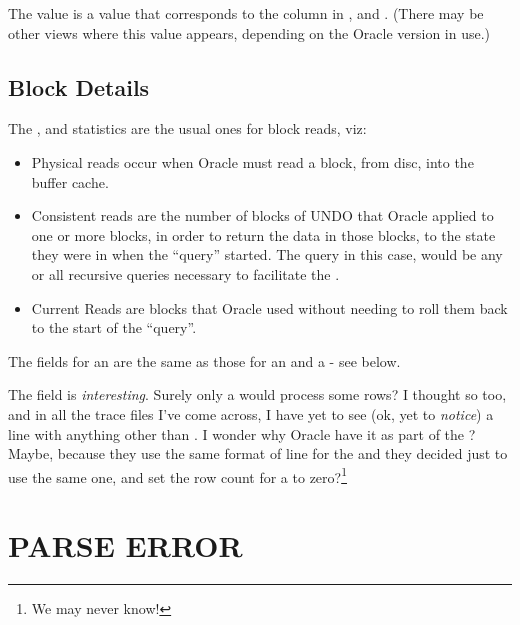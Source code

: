 The  value is a value that corresponds to the column  in ,  and . (There may be other views where this value appears, depending on the Oracle version in use.)

\subsection*{Block Details}\label{block-details}


The ,  and  statistics are the usual ones for block reads, viz:

\begin{itemize}
\tightlist
\item
  Physical reads occur when Oracle must read a block, from disc, into the buffer cache.
\item
  Consistent reads are the number of blocks of UNDO that Oracle applied to one or more blocks, in order to return the data in those blocks, to the state they were in when the ``query'' started. The query in this case, would be any or all recursive queries necessary to facilitate the .
\item
  Current Reads are blocks that Oracle used without needing to roll them back to the start of the ``query''.
\end{itemize}

The fields for an  are the same as those for an  and a  - see below.

The  field is \emph{interesting}. Surely only a  would process some rows? I thought so too, and in all the trace files I've come across, I have yet to see (ok, yet to \emph{notice}) a  line with anything other than . I wonder why Oracle have it as part of the ? Maybe, because they use the same format of line for the  and  they decided just to use the same one, and set the row count for a  to zero?\footnote{We may never know!}

\newpage\section{PARSE ERROR}\label{parse-error}

